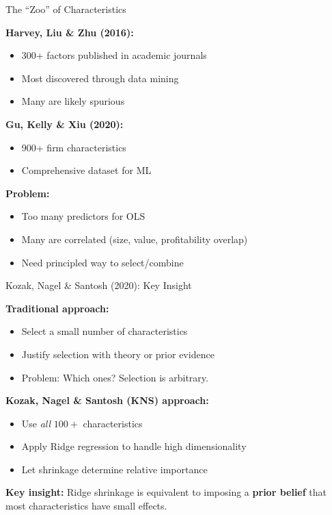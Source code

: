 \documentclass[10pt]{beamer}
\newcommand{\highlight}[1]{\textcolor{AccentOrange}{\textbf{#1}}}
\begin{document}
\begin{frame}{The ``Zoo'' of Characteristics}

\textbf{Harvey, Liu \& Zhu (2016):}
\begin{itemize}
  \item 300+ factors published in academic journals
  \item Most discovered through data mining
  \item Many are likely spurious
\end{itemize}

\vspace{1em}
\textbf{Gu, Kelly \& Xiu (2020):}
\begin{itemize}
  \item 900+ firm characteristics
  \item Comprehensive dataset for ML
\end{itemize}

\vspace{1em}
\textbf{Problem:}
\begin{itemize}
  \item Too many predictors for OLS
  \item Many are correlated (size, value, profitability overlap)
  \item Need principled way to select/combine
\end{itemize}

\end{frame}


\begin{frame}{Kozak, Nagel \& Santosh (2020): Key Insight}

\textbf{Traditional approach:}
\begin{itemize}
  \item Select a small number of characteristics
  \item Justify selection with theory or prior evidence
  \item Problem: Which ones? Selection is arbitrary.
\end{itemize}

\vspace{1em}
\textbf{Kozak, Nagel \& Santosh (KNS) approach:}
\begin{itemize}
  \item Use \emph{all} $100+$ characteristics
  \item Apply Ridge regression to handle high dimensionality
  \item Let shrinkage determine relative importance
\end{itemize}

\vspace{1em}
\textbf{Key insight:} Ridge shrinkage is equivalent to imposing a \highlight{prior belief} that most characteristics have small effects.

\end{frame}
\end{document}
